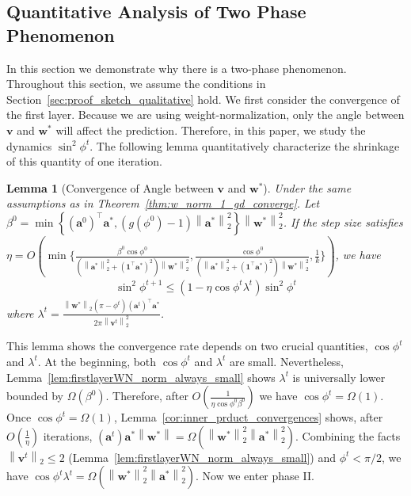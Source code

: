 \documentclass{article}
\newcommand{\firstlayer}{w}
\newcommand{\firstlayerWN}{v}
\newcommand{\secondlayer}{a}
\newcommand{\vect}[1]{\mathbf{#1}}
\newcommand{\norm}[1]{\left\|#1\right\|}
\newtheorem{lem}{Lemma}[section]
\begin{document}
\subsection{Quantitative Analysis of Two Phase Phenomenon}\label{sec:proof_sketch_quantitative}
In this section we demonstrate why there is a two-phase phenomenon.
Throughout this section, we assume the conditions in Section~\ref{sec:proof_sketch_qualitative} hold. 
We first consider the convergence of the first layer.
Because we are using weight-normalization, only the angle between $\vect{\firstlayerWN}$ and $\vect{\firstlayer}^*$ will affect the prediction.
Therefore, in this paper, we study the dynamics $\sin^2\phi^t$.
The following lemma quantitatively characterize the shrinkage of this quantity of one iteration.
\begin{lem}[Convergence of Angle between $\vect{\firstlayerWN}$ and $\vect{\firstlayer}^*$]\label{lem:first_layer_convergence_one_iter}
	Under the same assumptions as in Theorem~\ref{thm:w_norm_1_gd_converge}.
	Let $\beta^0 = \min\left\{\left(\vect{\secondlayer}^0\right)^\top \vect{\secondlayer}^*,\left(g(\phi^0)-1\right)\norm{\vect{\secondlayer}^*}_2^2\right\}\norm{\vect{\firstlayer}^*}_2^2$.
	If the step size satisfies 
	$\eta = O
	( \min\{\frac{\beta^0\cos\phi^0}{\left(\norm{\vect{\secondlayer}^*}_2^2+\left(\vect{1}^\top \vect{\secondlayer}^*\right)^2\right)\norm{\vect{\firstlayer}^*}_2^2}, \frac{\cos\phi^0}{\left(\norm{\vect{\secondlayer}^*}_2^2+\left(\vect{1}^\top \vect{\secondlayer}^*\right)^2\right)\norm{\vect{\firstlayer}^*}_2^2},\frac{1}{k}\})$, we have \begin{align*}
	\sin^2\phi^{t+1} \le \left(1-\eta\cos\phi^t\lambda^t\right)\sin^2\phi^t
	\end{align*}  where $\lambda^t = \frac{\norm{\vect{\firstlayer}^*}_2\left(\pi-\phi^t\right)\left(\vect{\secondlayer}^t\right)^\top\vect{\secondlayer}^*}{2\pi\norm{\vect{\firstlayerWN}^t}_2^2}$.
\end{lem}
This lemma shows the convergence rate depends on two crucial quantities, $\cos \phi^t$ and $\lambda^t$.
At the beginning, both $\cos\phi^t$ and $\lambda^t$ are small.
Nevertheless, Lemma~\ref{lem:firstlayerWN_norm_always_small} shows $\lambda^t$ is universally lower bounded by $\Omega\left(\beta^0\right)$.
Therefore, after $O(\frac{1}{\eta\cos\phi^0 \beta^0})$ we have $\cos\phi^t = \Omega\left(1\right)$.
Once $\cos\phi^t = \Omega\left(1\right)$, Lemma~\ref{cor:inner_prduct_convergences} shows, after $O\left(\frac{1}{\eta}\right)$ iterations, $\left(\vect{\secondlayer}^t\right)\vect{\secondlayer}^*\norm{\vect{\firstlayer}^*} = \Omega\left(\norm{\vect{\firstlayer}^*}_2^2\norm{\vect{\secondlayer}^*}_2^2\right)$.
Combining the facts $\norm{\vect{\firstlayerWN}^t}_2 \le 2$ (Lemma~\ref{lem:firstlayerWN_norm_always_small}) and $\phi^t < \pi/2$, we have $\cos\phi^t\lambda^t = \Omega\left(\norm{\vect{\firstlayer}^*}_2^2\norm{\vect{\secondlayer}^*}_2^2\right)$.
Now we enter phase II. 
\end{document}
